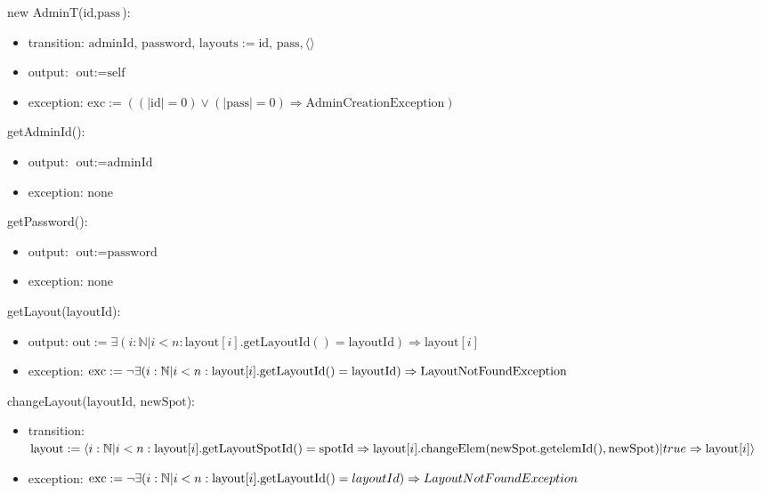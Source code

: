 \documentclass[12pt, titlepage]{article}
\begin{document}
\noindent new AdminT($\text{id}, \text{pass}$):
\begin{itemize}
\item transition: $\text{adminId, password, layouts} :=  \text{id, pass},
\langle \rangle$
\item output: $\text{out} := \text{self}$
\item exception: $\text{exc} := ((|\text{id}| = 0) \vee (|\text{pass}| = 0)
\Rightarrow \text{AdminCreationException})$
\end{itemize}

\noindent getAdminId():
\begin{itemize} 
\item output: $\text{out} := \text{adminId}$
\item exception: none
\end{itemize}

\noindent getPassword():
\begin{itemize} 
\item output: $\text{out} := \text{password}$
\item exception: none
\end{itemize}

\noindent getLayout($\text{layoutId}$):
\begin{itemize} 
\item output: $\text{out} := \exists (i:\mathbb{N}|i < n :
\text{layout}[i].\text{getLayoutId}() = \text{layoutId}) \Rightarrow
\text{layout}[i]$
\item exception: $\text{exc} := \neg \exists (i:\mathbb{N}|i < n :
\text{layout}[i].\text{getLayoutId}() = \text{layoutId}) \Rightarrow \\
\text{LayoutNotFoundException}$
\end{itemize}

\noindent changeLayout($\text{layoutId, newSpot}$):
\begin{itemize} 
\item transition: $\text{layout} := \langle i:\mathbb{N} | i < n :
\text{layout}[i].\text{getLayoutSpotId}() = \text{spotId} \Rightarrow \\
\text{layout}[i].\text{changeElem}(\text{newSpot}.\text{get\text{elemId}}(),
\text{newSpot}) | true \Rightarrow \text{layout}[i] \rangle$
\item exception: $\text{exc} := \neg \exists (i:\mathbb{N}|i < n :
\text{layout}[i].\text{getLayoutId}() = layoutId) \Rightarrow \\
LayoutNotFoundException$
\end{itemize}
\end{document}
